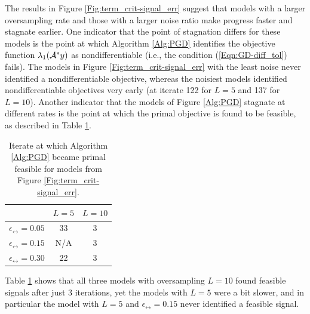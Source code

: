 The results in Figure \ref{Fig:term_crit-signal_err} suggest that models with a larger oversampling rate and those with a larger noise ratio make progress faster and stagnate earlier.  One indicator that the point of stagnation differs for these models is the point at which Algorithm \ref{Alg:PGD} identifies the objective function $\lambda_1({\mathcal A}^*y)$ as nondifferentiable (i.e., the condition (\ref{Eqn:GD-diff_tol}) fails).  The models in Figure \ref{Fig:term_crit-signal_err} with the least noise never identified a nondifferentiable objective, whereas the noisiest models identified nondifferentiable objectives very early (at iterate 122 for $L=5$ and 137 for $L=10$).  Another indicator that the models of Figure \ref{Alg:PGD} stagnate at different rates is the point at which the primal objective is found to be feasible, as described in Table \ref{Tab:term_crit-pr_feas_faster_for_big_L_noise}.

\begin{table}[H]
\centering
\begin{tabular}{ |c|c|c| }
\hline
&	$L = 5$
	&	$L = 10$	\\
 \hline
$\epsilon_\rel = 0.05$
&     33 &   3 		\\
 \hline
$\epsilon_\rel = 0.15$
&  N/A &  3 	\\
 \hline
$\epsilon_\rel = 0.30$
&  22 &  3	\\
 \hline
\end{tabular}
	\caption{Iterate at which Algorithm \ref{Alg:PGD} became primal feasible for models from Figure \ref{Fig:term_crit-signal_err}.}
	\label{Tab:term_crit-pr_feas_faster_for_big_L_noise}
\end{table}

Table \ref{Tab:term_crit-pr_feas_faster_for_big_L_noise} shows that all three models with oversampling $L = 10$ found feasible signals after just 3 iterations, yet the models with $L = 5$ were a bit slower, and in particular the model with $L = 5$ and $\epsilon_\rel = 0.15$ never identified a feasible signal.


